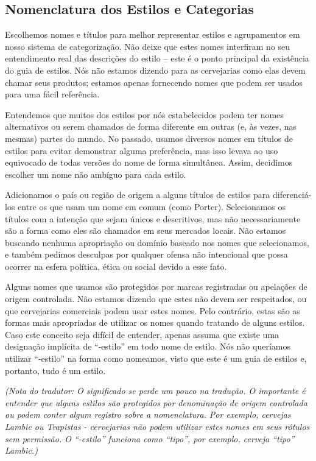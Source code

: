 \subsection*{Nomenclatura dos Estilos e Categorias}

Escolhemos nomes e títulos para melhor representar estilos e agrupamentos em nosso sistema de categorização. Não deixe que estes nomes interfiram no seu entendimento real das descrições do estilo – este é o ponto principal da existência do guia de estilos. Nós não estamos dizendo para as cervejarias como elas devem chamar seus produtos; estamos apenas fornecendo nomes que podem ser usados para uma fácil referência.

Entendemos que muitos dos estilos por nós estabelecidos podem ter nomes alternativos ou serem chamados de forma diferente em outras (e, às vezes, nas mesmas) partes do mundo. No passado, usamos diversos nomes em títulos de estilos para evitar demonstrar alguma preferência, mas isso levava ao uso equivocado de todas versões do nome de forma simultânea. Assim, decidimos escolher um nome não ambíguo para cada estilo.

Adicionamos o país ou região de origem a alguns títulos de estilos para diferenciá-los entre os que usam um nome em comum (como Porter). Selecionamos os títulos com a intenção que sejam únicos e descritivos, mas não necessariamente são a forma como eles são chamados em seus mercados locais. Não estamos buscando nenhuma apropriação ou domínio baseado nos nomes que selecionamos, e também pedimos desculpas por qualquer ofensa não intencional que possa ocorrer na esfera política, ética ou social devido a esse fato.

Alguns nomes que usamos são protegidos por marcas registradas ou apelações de origem controlada. Não estamos dizendo que estes não devem ser respeitados, ou que cervejarias comerciais podem usar estes nomes. Pelo contrário, estas são as formas mais apropriadas de utilizar os nomes quando tratando de alguns estilos. Caso este conceito seja difícil de entender, apenas assuma que existe uma designação implícita de “-estilo” em todo nome de estilo. Nós não queríamos utilizar “-estilo” na forma como nomeamos, visto que este é um guia de estilos e, portanto, tudo é um estilo.

\textit{(Nota do tradutor: O significado se perde um pouco na tradução. O importante é entender que alguns estilos são protegidos por denominação de origem controlada ou podem conter algum registro sobre a nomenclatura. Por exemplo, cervejas Lambic ou Trapistas - cervejarias não podem utilizar estes nomes em seus rótulos sem permissão. O “-estilo” funciona como “tipo”, por exemplo, cerveja “tipo” Lambic.)}
